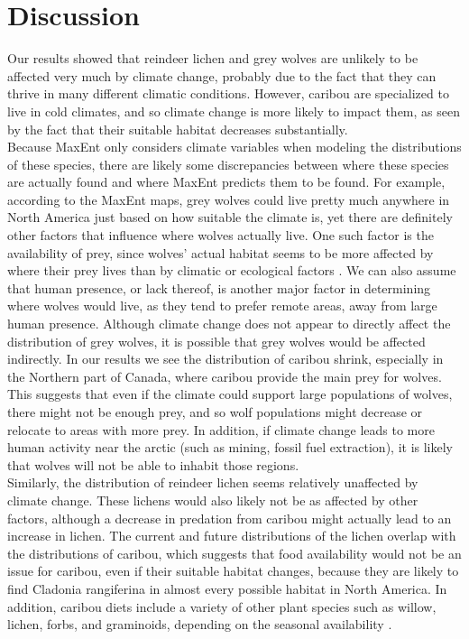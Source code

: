 \documentclass[twoside]{article}
\begin{document}
\section{Discussion}
\indent Our results showed that reindeer lichen and grey wolves are unlikely
to be affected very much by climate change, probably due to the fact
that they can thrive in many different climatic conditions. However,
caribou are specialized to live in cold climates, and so climate change
is more likely to impact them, as seen by the fact that their suitable
habitat decreases substantially. \\
\indent Because MaxEnt only considers climate variables when modeling the distributions
of these species, there are likely some discrepancies between where these
species are actually found and where MaxEnt predicts them to be found. For
example, according to the MaxEnt maps, grey wolves could live pretty much
anywhere in North America just based on how suitable the climate is, yet
there are definitely other factors that influence where wolves actually
live. One such factor is the availability of prey, since wolves’ actual
habitat seems to be more affected by where their prey lives than by climatic
or ecological factors \cite{usfs1}. We can also assume that human
presence, or lack thereof, is another major factor in determining where wolves
would live, as they tend to prefer remote areas, away from large human
presence. Although climate change does not appear to directly affect the
distribution of grey wolves, it is possible that grey wolves would be affected
indirectly. In our results we see the distribution of caribou shrink,
especially in the Northern part of Canada, where caribou provide the main
prey for wolves. This suggests that even if the climate could support
large populations of wolves, there might not be enough prey, and so wolf
populations might decrease or relocate to areas with more prey. In addition,
if climate change leads to more human activity near the arctic
(such as mining, fossil fuel extraction), it is likely that wolves will
not be able to inhabit those regions. \\
\indent Similarly, the distribution of reindeer lichen seems relatively unaffected
by climate change. These lichens would also likely not be as affected by
other factors, although a decrease in predation from caribou might actually
lead to an increase in lichen. The current and future distributions of the
lichen overlap with the distributions of caribou, which suggests that food
availability would not be an issue for caribou, even if their suitable
habitat changes, because they are likely to find Cladonia rangiferina in
almost every possible habitat in North America. In addition, caribou diets
include a variety of other plant species such as willow, lichen, forbs, and
graminoids, depending on the seasonal availability \cite{elenart}.



\small



\end{document}
